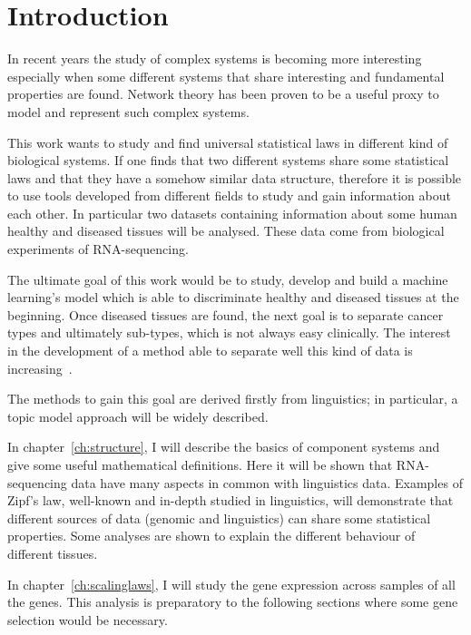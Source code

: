 \chapter*{Introduction}\label{ch:intro}
In recent years the study of complex systems is becoming more interesting especially when some different systems that share interesting and fundamental properties are found. Network theory has been proven to be a useful proxy to model and represent such complex systems.

This work wants to study and find universal statistical laws in different kind of biological systems. If one finds that two different systems share some statistical laws and that they have a somehow similar data structure, therefore it is possible to use tools developed from different fields to study and gain information about each other. In particular two datasets containing information about some human healthy and diseased tissues will be analysed. These data come from biological experiments of RNA-sequencing.

The ultimate goal of this work would be to study, develop and build a machine learning's model which is able to discriminate healthy and diseased tissues at the beginning. Once diseased tissues are found, the next goal is to separate cancer types and ultimately sub-types, which is not always easy clinically. The interest in the development of a method able to separate well this kind of data is increasing~\cite{Farver2018}.

The methods to gain this goal are derived firstly from linguistics; in particular, a topic model approach will be widely described.


In chapter~\ref{ch:structure}, I will describe the basics of component systems and give some useful mathematical definitions. Here it will be shown that RNA-sequencing data have many aspects in common with linguistics data. Examples of Zipf's law, well-known and in-depth studied in linguistics, will demonstrate that different sources of data (genomic and linguistics) can share some statistical properties. Some analyses are shown to explain the different behaviour of different tissues.

In chapter~\ref{ch:scalinglaws}, I will study the gene expression across samples of all the genes. This analysis is preparatory to the following sections where some gene selection would be necessary.


